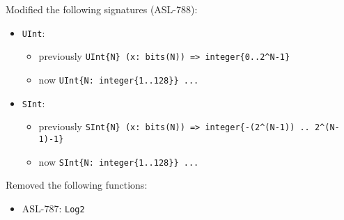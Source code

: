 \noindent
Modified the following signatures (ASL-788):
\begin{itemize}
  \item \texttt{UInt}:
    \begin{itemize}
      \item previously \verb|UInt{N} (x: bits(N)) => integer{0..2^N-1}|
      \item now \verb|UInt{N: integer{1..128}} ...|
    \end{itemize}
  \item \texttt{SInt}:
    \begin{itemize}
      \item previously \verb|SInt{N} (x: bits(N)) => integer{-(2^(N-1)) .. 2^(N-1)-1}|
      \item now \verb|SInt{N: integer{1..128}} ...|
    \end{itemize}
\end{itemize}

\noindent
Removed the following functions:
\begin{itemize}
  \item ASL-787: \texttt{Log2}
\end{itemize}
